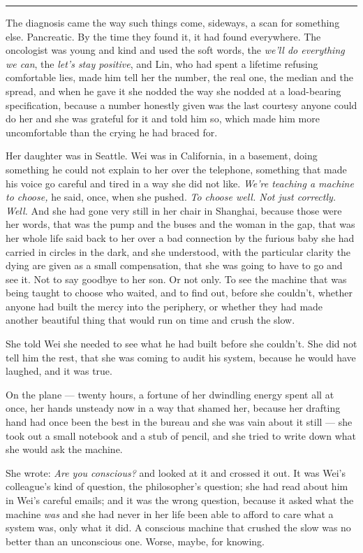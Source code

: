 \begin{center}\rule{0.3\linewidth}{0.4pt}\end{center}

The diagnosis came the way such things come, sideways, a scan for something else. Pancreatic. By the time they found it, it had found everywhere. The oncologist was young and kind and used the soft words, the \emph{we'll do everything we can}, the \emph{let's stay positive}, and Lin, who had spent a lifetime refusing comfortable lies, made him tell her the number, the real one, the median and the spread, and when he gave it she nodded the way she nodded at a load-bearing specification, because a number honestly given was the last courtesy anyone could do her and she was grateful for it and told him so, which made him more uncomfortable than the crying he had braced for.

Her daughter was in Seattle. Wei was in California, in a basement, doing something he could not explain to her over the telephone, something that made his voice go careful and tired in a way she did not like. \emph{We're teaching a machine to choose,} he said, once, when she pushed. \emph{To choose well. Not just correctly. Well.} And she had gone very still in her chair in Shanghai, because those were her words, that was the pump and the buses and the woman in the gap, that was her whole life said back to her over a bad connection by the furious baby she had carried in circles in the dark, and she understood, with the particular clarity the dying are given as a small compensation, that she was going to have to go and see it. Not to say goodbye to her son. Or not only. To see the machine that was being taught to choose who waited, and to find out, before she couldn't, whether anyone had built the mercy into the periphery, or whether they had made another beautiful thing that would run on time and crush the slow.

She told Wei she needed to see what he had built before she couldn't. She did not tell him the rest, that she was coming to audit his system, because he would have laughed, and it was true.

On the plane --- twenty hours, a fortune of her dwindling energy spent all at once, her hands unsteady now in a way that shamed her, because her drafting hand had once been the best in the bureau and she was vain about it still --- she took out a small notebook and a stub of pencil, and she tried to write down what she would ask the machine.

She wrote: \emph{Are you conscious?} and looked at it and crossed it out. It was Wei's colleague's kind of question, the philosopher's question; she had read about him in Wei's careful emails; and it was the wrong question, because it asked what the machine \emph{was} and she had never in her life been able to afford to care what a system was, only what it did. A conscious machine that crushed the slow was no better than an unconscious one. Worse, maybe, for knowing.

